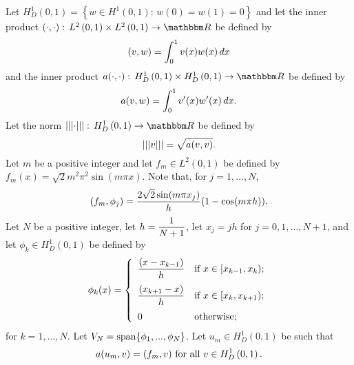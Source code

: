 Let $H^1_D\left(0,1\right)=\left\{w\in H^1\left(0,1\right):\,w(0)=w(1)=0\right\}$ and let the inner product $\ip{\cdot,\cdot}:\,L^2\left(0,1\right)\times L^2\left(0,1\right)\to\R$ be defined by
\[
(v,w)=\int_0^1v(x)w(x)\,dx
\]
and the inner product $a\ip{\cdot,\cdot}:\,H^1_D\left(0,1\right)\times H^1_D\left(0,1\right)\to\R$ be defined by
\[
a(v,w)=\int_0^1v'(x)w'(x)\,dx.
\]
Let the norm $\left|\left|\left|\cdot\right|\right|\right|:\,H^1_D\left(0,1\right)\to\R$ be defined by
\[
\left|\left|\left|v\right|\right|\right|=\sqrt{a(v,v)}.
\]
Let $m$ be a positive integer and let $f_m\in L^2\left(0,1\right)$ be defined by $f_m(x)=\sqrt{2}m^2\pi^2\sin(m\pi x)$. Note that, for $j=1,\ldots,N$,
\[
(f_m,\phi_j) = {2\sqrt{2}\sin(m\pi x_j) \over h} (1 - \cos(m\pi h)).
\]
Let $N$ be a positive integer, let $\displaystyle{h={1 \over N+1}}$, let $x_j=jh$ for $j=0,1,\ldots,N+1$, and let $\phi_k\in H^1_D\left(0,1\right)$ be defined by
\[
\phi_k(x) = \left\{\begin{array}{ll}
\displaystyle{{(x-x_{k-1}) \over h}} & \displaystyle{\mbox{if }x\in[x_{k-1},x_k)};
\\[10pt]
\displaystyle{{(x_{k+1}-x) \over h}} & \displaystyle{\mbox{if }x\in[x_k,x_{k+1})};
\\[10pt]
0 & \mbox{otherwise};
\end{array}\right.
\]
for $k=1,\ldots,N$. Let $V_N={\rm span}\{\phi_1,...,\phi_N\}$. Let $u_m\in H^1_D\left(0,1\right)$ be such that
\[
a(u_m,v)=(f_m,v)\mbox{ for all }v\in H^1_D\left(0,1\right).
\]



